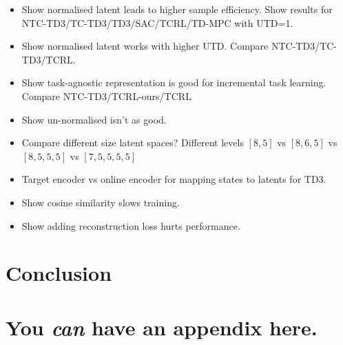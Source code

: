 \documentclass{article}
\theoremstyle{plain}
\theoremstyle{definition}
\theoremstyle{remark}
\begin{document}
\begin{itemize}
    \item Show normalised latent leads to higher sample efficiency. Show results for NTC-TD3/TC-TD3/TD3/SAC/TCRL/TD-MPC with UTD=1.
    \item Show normalised latent works with higher UTD. Compare NTC-TD3/TC-TD3/TCRL.
    \item Show task-agnostic representation is good for incremental task learning. Compare NTC-TD3/TCRL-ours/TCRL
\end{itemize}




\begin{itemize}
  \item Show un-normalised isn't as good.
  \item Compare different size latent spaces? Different levels $[8,5]$ vs $[8,6,5]$ vs $[8,5,5,5]$ vs $[7,5,5,5,5]$
  \item Target encoder vs online encoder for mapping states to latents for TD3.
  \item Show cosine similarity slows training.
  \item Show adding reconstruction loss hurts performance.
\end{itemize}







\section{Conclusion}
\label{conclusion}






\newpage
\appendix
\onecolumn
\section{You \emph{can} have an appendix here.}
\end{document}
